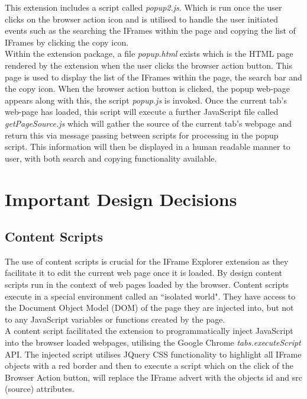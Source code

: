 \documentclass[12pt]{article}
\begin{document}
This extension includes a script called \textit{popup2.js}. Which is run once the user clicks on the browser action icon and is utilised to handle the user initiated events such as the searching the IFrames within the page and copying the list of IFrames by clicking the copy icon. \\

Within the extension package, a file \textit{popup.html} exists which is the HTML page rendered by the extension when the user clicks the browser action button. This page is used to display the list of the IFrames within the page, the search bar and the copy icon. When the browser action button is clicked, the popup web-page appears along with this, the script \textit{popup.js} is invoked. Once the current tab's web-page has loaded, this script will execute a further JavaScript file called \textit{getPageSource.js} which will gather the source of the current tab's webpage and return this via message passing between scripts for processing in the popup script. This information will then be displayed in a human readable manner to user, with both search and copying functionality available.

\pagebreak

\section{Important Design Decisions}

\subsection{Content Scripts} \label{Content_Scripts}
The use of content scripts is crucial for the IFrame Explorer extension as they facilitate it to edit the current web page once it is loaded. By design content scripts run in the context of web pages loaded by the browser. Content scripts execute in a special environment called an ``isolated world". They have access to the Document Object Model (DOM) of the page they are injected into, but not to any JavaScript variables or functions created by the page. \\ 

A content script facilitated the extension to programmatically inject JavaScript into the browser loaded webpages, utilising the Google Chrome \textit{tabs.executeScript} API. The injected script utilises JQuery CSS functionality to highlight all IFrame objects with a red border and then to execute a script which on the click of the Browser Action button, will replace the IFrame advert with the objects id and src (source) attributes.  \\
\end{document}
